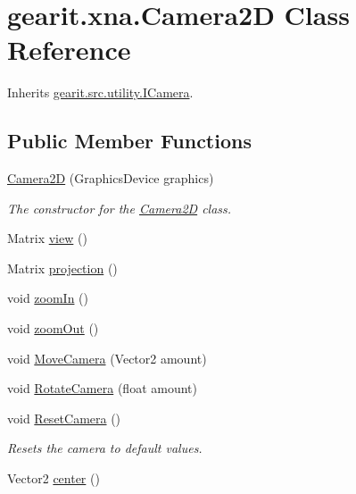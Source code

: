 \hypertarget{classgearit_1_1xna_1_1_camera2_d}{\section{gearit.\+xna.\+Camera2\+D Class Reference}
\label{classgearit_1_1xna_1_1_camera2_d}
}


Inherits \hyperlink{interfacegearit_1_1src_1_1utility_1_1_i_camera}{gearit.\+src.\+utility.\+I\+Camera}.

\subsection*{Public Member Functions}
\begin{DoxyCompactItemize}
\item 
\hyperlink{classgearit_1_1xna_1_1_camera2_d_a773df33cf166078cd4ff1dd87c9cee69}{Camera2\+D} (Graphics\+Device graphics)
\begin{DoxyCompactList}\small\item\em The constructor for the \hyperlink{classgearit_1_1xna_1_1_camera2_d}{Camera2\+D} class. \end{DoxyCompactList}\item 
Matrix \hyperlink{classgearit_1_1xna_1_1_camera2_d_a954c28042052256f49a3a1f8102459a4}{view} ()
\item 
Matrix \hyperlink{classgearit_1_1xna_1_1_camera2_d_a87ff1c51b4085fb4ddfb64ae8d785765}{projection} ()
\item 
void \hyperlink{classgearit_1_1xna_1_1_camera2_d_adfa85578bab16b2228d82755f065fbe1}{zoom\+In} ()
\item 
void \hyperlink{classgearit_1_1xna_1_1_camera2_d_a56561d430a0c0efe639f75c30b5ff348}{zoom\+Out} ()
\item 
void \hyperlink{classgearit_1_1xna_1_1_camera2_d_a7aa9739c4210a6605f25bb58a39dafaf}{Move\+Camera} (Vector2 amount)
\item 
void \hyperlink{classgearit_1_1xna_1_1_camera2_d_a541b430eb8529297a0380994269960b4}{Rotate\+Camera} (float amount)
\item 
void \hyperlink{classgearit_1_1xna_1_1_camera2_d_a836e342bc57a181b0e111eca0046cfa7}{Reset\+Camera} ()
\begin{DoxyCompactList}\small\item\em Resets the camera to default values. \end{DoxyCompactList}\item 
Vector2 \hyperlink{classgearit_1_1xna_1_1_camera2_d_abaaa9f2d566692b51615103c31233381}{center} ()

\end{DoxyCompactItemize}
